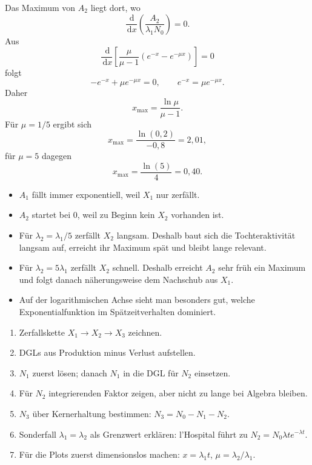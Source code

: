\documentclass[11pt,a4paper]{scrartcl}
\newcommand{\paren}[1]{\left( #1 \right)}
\newcommand{\bracket}[1]{\left[ #1 \right]}
\newcommand{\dd}{\,\mathrm{d}}
\newcommand{\dv}[2]{\frac{\dd #1}{\dd #2}}
\theoremstyle{definition}
\theoremstyle{plain}
\theoremstyle{remark}
\begin{document}
\FloatBarrier

\begin{calculationbox}[title=Lerninterpretation der Maxima]
Das Maximum von $A_2$ liegt dort, wo
\[
    \dv{}{x}\paren{\frac{A_2}{\lambda_1N_0}}=0.
\]
Aus
\[
    \dv{}{x}\bracket{\frac{\mu}{\mu-1}\paren{e^{-x}-e^{-\mu x}}}=0
\]
folgt
\[
    -e^{-x}+\mu e^{-\mu x}=0,
    \qquad
    e^{-x}=\mu e^{-\mu x}.
\]
Daher
\[
    x_{\max}=\frac{\ln\mu}{\mu-1}.
\]
Für $\mu=1/5$ ergibt sich
\[
    x_{\max}=\frac{\ln(0{,}2)}{-0{,}8}=2{,}01,
\]
für $\mu=5$ dagegen
\[
    x_{\max}=\frac{\ln(5)}{4}=0{,}40.
\]
\end{calculationbox}

\begin{summarybox}[title=Physikalische Deutung von Aufgabe 2(d)]
\begin{itemize}
    \item $A_1$ fällt immer exponentiell, weil $X_1$ nur zerfällt.
    \item $A_2$ startet bei $0$, weil zu Beginn kein $X_2$ vorhanden ist.
    \item Für $\lambda_2=\lambda_1/5$ zerfällt $X_2$ langsam. Deshalb baut sich die Tochteraktivität langsam auf, erreicht ihr Maximum spät und bleibt lange relevant.
    \item Für $\lambda_2=5\lambda_1$ zerfällt $X_2$ schnell. Deshalb erreicht $A_2$ sehr früh ein Maximum und folgt danach näherungsweise dem Nachschub aus $X_1$.
    \item Auf der logarithmischen Achse sieht man besonders gut, welche Exponentialfunktion im Spätzeitverhalten dominiert.
\end{itemize}
\end{summarybox}

\begin{talkbox}[title=Tafelvortrag zu Aufgabe 2]
\begin{enumerate}
    \item Zerfallskette $X_1\to X_2\to X_3$ zeichnen.
    \item DGLs aus Produktion minus Verlust aufstellen.
    \item $N_1$ zuerst lösen; danach $N_1$ in die DGL für $N_2$ einsetzen.
    \item Für $N_2$ integrierenden Faktor zeigen, aber nicht zu lange bei Algebra bleiben.
    \item $N_3$ über Kernerhaltung bestimmen: $N_3=N_0-N_1-N_2$.
    \item Sonderfall $\lambda_1=\lambda_2$ als Grenzwert erklären: l'Hospital führt zu $N_2=N_0\lambda t e^{-\lambda t}$.
    \item Für die Plots zuerst dimensionslos machen: $x=\lambda_1t$, $\mu=\lambda_2/\lambda_1$.
\end{enumerate}
\end{talkbox}
\end{document}
